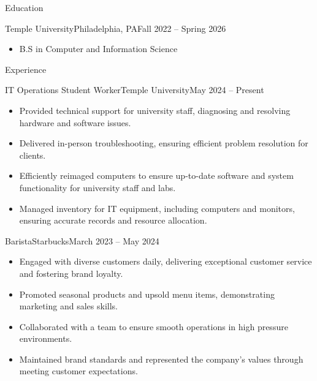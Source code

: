 \documentclass[]{mcdowellcv}
\begin{document}
	\makeheader
	
	
	\begin{cvsection}{Education}
		\begin{cvsubsection}{Temple University}{Philadelphia, PA}{Fall 2022 -- Spring 2026}
			\begin{itemize}
				\item B.S in Computer and Information Science
			\end{itemize}
		\end{cvsubsection}
	\end{cvsection}


	\begin{cvsection}{Experience}
		\begin{cvsubsection}{IT Operations Student Worker}{Temple University}{May 2024 -- Present}			
			\begin{itemize}
				\item Provided technical support for university staff, diagnosing and resolving hardware and software issues.
				\item Delivered in-person troubleshooting, ensuring efficient problem resolution for clients.
				\item Efficiently reimaged computers to ensure up-to-date software and system functionality for university staff and labs.
				\item Managed inventory for IT equipment, including computers and monitors, ensuring accurate records and resource allocation.
			\end{itemize}
		\end{cvsubsection}
		
		\begin{cvsubsection}{Barista}{Starbucks}{March 2023 -- May 2024}	
			\begin{itemize}
				\item Engaged with diverse customers daily, delivering exceptional customer service and fostering brand loyalty.
				\item Promoted seasonal products and upsold menu items, demonstrating marketing and sales skills.
				\item Collaborated with a team to ensure smooth operations in high pressure environments.
				\item Maintained brand standards and represented the company’s values through meeting customer expectations.
			\end{itemize}
		\end{cvsubsection}


\end{cvsection}
\end{document}
